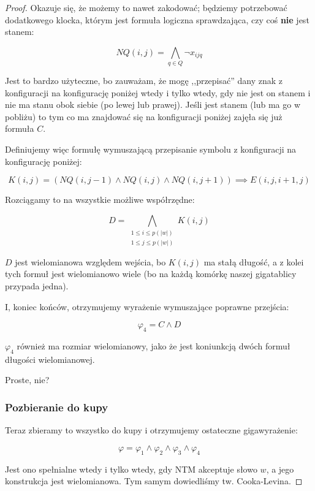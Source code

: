 \begin{proof}
	Okazuje się, że możemy to nawet zakodować; będziemy potrzebować dodatkowego klocka, którym jest formuła logiczna sprawdzająca, czy coś \textbf{nie} jest stanem:

	\[
		NQ(i,j) = \bigwedge_{q \in Q} \neg x_{ijq}
	\]

	Jest to bardzo użyteczne, bo zauważam, że mogę ,,przepisać'' dany znak z konfiguracji na konfigurację poniżej wtedy i tylko wtedy, gdy nie jest on stanem i nie ma stanu obok siebie (po lewej lub prawej). Jeśli jest stanem (lub ma go w pobliżu) to tym co ma znajdować się na konfiguracji poniżej zajęła się już formuła \(C\).

	Definiujemy więc formułę wymuszającą przepisanie symbolu z konfiguracji na konfigurację poniżej:

	\[
		K(i,j) = (NQ(i, j-1) \land NQ(i,j) \land NQ(i, j+1)) \implies E(i, j, i+1, j)
	\]

	Rozciągamy to na wszystkie możliwe współrzędne:

	\[
		D = \bigwedge_{\substack{1 \leq i \leq p(|w|) \\ 1 \leq j \leq p(|w|)}} K(i,j)
	\]

	\(D\) jest wielomianowa względem wejścia, bo \(K(i,j)\) ma stałą długość, a z kolei tych formuł jest wielomianowo wiele (bo na każdą komórkę naszej gigatablicy przypada jedna).

	I, koniec końców, otrzymujemy wyrażenie wymuszające poprawne przejścia:

	\[
		\varphi_4 = C \land D
	\]

	\(\varphi_4\) również ma rozmiar wielomianowy, jako że jest koniunkcją dwóch formuł długości wielomianowej.

	Proste, nie?

	\subsubsection{Pozbieranie do kupy}

	Teraz zbieramy to wszystko do kupy i otrzymujemy ostateczne gigawyrażenie:

	\[
		\varphi = \varphi_1 \land \varphi_2 \land \varphi_3 \land \varphi_4
	\]

	Jest ono spełnialne wtedy i tylko wtedy, gdy NTM akceptuje słowo \(w\), a jego konstrukcja jest wielomianowa. Tym samym dowiedliśmy tw. Cooka-Levina.
\end{proof}
